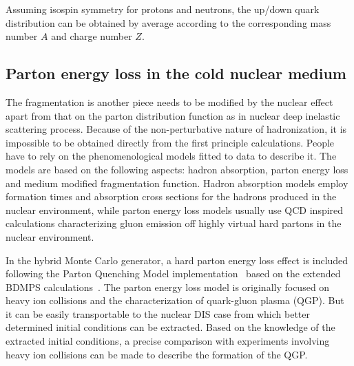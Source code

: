 Assuming isospin symmetry for protons and neutrons, the up/down quark
distribution can be obtained by average according to the corresponding mass
number $A$ and charge number $Z$.


\subsection{Parton energy loss in the cold nuclear medium } \label{sec:energy_loss}
The fragmentation is another piece needs to be modified by the nuclear effect
apart from that on the parton distribution function as in nuclear deep inelastic
scattering process. Because of the non-perturbative nature of hadronization, it
is impossible to be obtained directly from the first principle calculations. People have
to rely on the phenomenological models fitted to data to describe it. The models
are based on the following aspects: hadron absorption, parton energy loss and medium
modified fragmentation function. Hadron absorption models employ formation
times and absorption cross sections for the hadrons produced in the nuclear
environment, while parton energy loss models usually use QCD inspired
calculations characterizing gluon emission off highly virtual hard partons in
the nuclear environment.

In the hybrid Monte Carlo generator, a hard parton energy loss effect is
included following the Parton Quenching Model
implementation~\cite{Dupre:2011afa} based on the extended BDMPS
calculations~\cite{Salgado:2003gb}. The parton energy loss model is originally
focused on heavy ion collisions and the characterization of quark-gluon plasma
(QGP). But it can be easily transportable to the nuclear DIS case from which better
determined initial conditions can be extracted. Based on the knowledge
of the extracted initial conditions, a precise comparison with experiments
involving heavy ion collisions can be made to describe the formation of the QGP.

